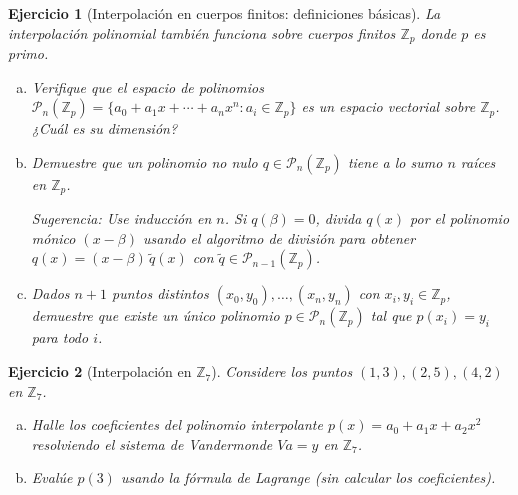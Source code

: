 \documentclass[12pt]{article}
\newtheorem{exercise}{Ejercicio}
\begin{document}
\begin{exercise}[Interpolación en cuerpos finitos: definiciones básicas]
La interpolación polinomial también funciona sobre cuerpos finitos $\mathbb{Z}_p$ donde $p$ es primo.
\begin{enumerate}[(a)]
\item Verifique que el espacio de polinomios $\mathcal{P}_n(\mathbb{Z}_p) = \{a_0 + a_1 x + \cdots + a_n x^n : a_i \in \mathbb{Z}_p\}$ es un espacio vectorial sobre $\mathbb{Z}_p$. ¿Cuál es su dimensión?
\item Demuestre que un polinomio no nulo $q \in \mathcal{P}_n(\mathbb{Z}_p)$ tiene a lo sumo $n$ raíces en $\mathbb{Z}_p$.

\textit{Sugerencia}: Use inducción en $n$. Si $q(\beta) = 0$, divida $q(x)$ por el polinomio mónico $(x - \beta)$ usando el algoritmo de división para obtener $q(x) = (x - \beta)\,\tilde{q}(x)$ con $\tilde{q} \in \mathcal{P}_{n-1}(\mathbb{Z}_p)$. 
\item Dados $n+1$ puntos distintos $(x_0, y_0), \ldots, (x_n, y_n)$ con $x_i, y_i \in \mathbb{Z}_p$, demuestre que existe un único polinomio $p \in \mathcal{P}_n(\mathbb{Z}_p)$ tal que $p(x_i) = y_i$ para todo $i$.
\end{enumerate}
\end{exercise}

\begin{exercise}[Interpolación en $\mathbb{Z}_7$]
Considere los puntos $(1, 3), (2, 5), (4, 2)$ en $\mathbb{Z}_7$.
\begin{enumerate}[(a)]
\item Halle los coeficientes del polinomio interpolante $p(x) = a_0 + a_1 x + a_2 x^2$ resolviendo el sistema de Vandermonde $Va = y$ en $\mathbb{Z}_7$.
\item Evalúe $p(3)$ usando la fórmula de Lagrange (sin calcular los coeficientes).
\end{enumerate}
\end{exercise}
\end{document}
